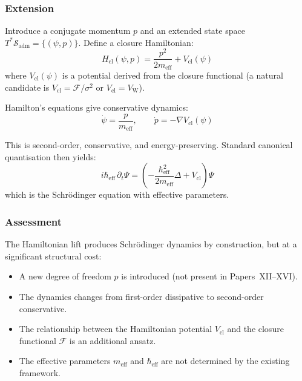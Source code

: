 \documentclass[12pt]{article}
\newcommand{\Fcal}{\mathcal{F}}
\newcommand{\Sadm}{\mathcal{S}_{\mathrm{adm}}}
\begin{document}
\subsubsection*{Extension}

Introduce a conjugate momentum $p$ and an extended state space $T^*\Sadm = \{(\psi, p)\}$. Define a closure Hamiltonian:
\begin{equation}\label{eq:hamiltonian}
    H_{\mathrm{cl}}(\psi, p) = \frac{p^2}{2m_{\mathrm{eff}}} + V_{\mathrm{cl}}(\psi)
\end{equation}
where $V_{\mathrm{cl}}(\psi)$ is a potential derived from the closure functional (a natural candidate is $V_{\mathrm{cl}} = \Fcal/\sigma^2$ or $V_{\mathrm{cl}} = V_{\mathrm{W}}$).

Hamilton's equations give conservative dynamics:
\begin{equation}
    \dot{\psi} = \frac{p}{m_{\mathrm{eff}}}, \qquad \dot{p} = -\nabla V_{\mathrm{cl}}(\psi)
\end{equation}

This is second-order, conservative, and energy-preserving. Standard canonical quantisation then yields:
\begin{equation}\label{eq:schrodinger_from_lift}
    i\hbar_{\mathrm{eff}}\,\partial_t\Psi = \left(-\frac{\hbar_{\mathrm{eff}}^2}{2m_{\mathrm{eff}}}\Delta + V_{\mathrm{cl}}\right)\Psi
\end{equation}
which is the Schr\"odinger equation with effective parameters.

\subsubsection*{Assessment}

The Hamiltonian lift produces Schr\"odinger dynamics by construction, but at a significant structural cost:
\begin{itemize}
    \item A new degree of freedom $p$ is introduced (not present in Papers~XII--XVI).
    \item The dynamics changes from first-order dissipative to second-order conservative.
    \item The relationship between the Hamiltonian potential $V_{\mathrm{cl}}$ and the closure functional $\Fcal$ is an additional ansatz.
    \item The effective parameters $m_{\mathrm{eff}}$ and $\hbar_{\mathrm{eff}}$ are not determined by the existing framework.
\end{itemize}
\end{document}

